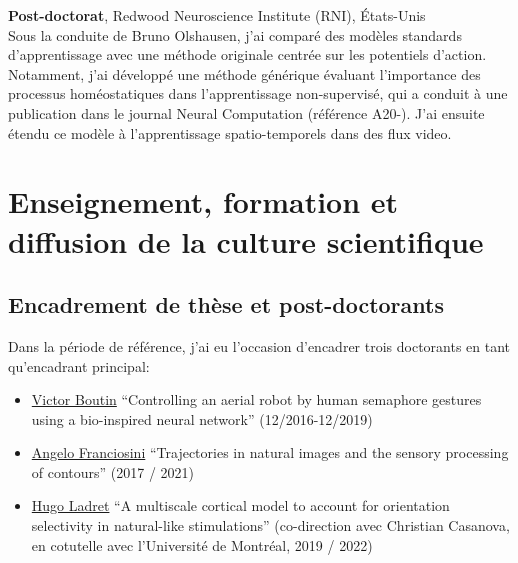 	\textbf{Post-doctorat}, Redwood Neuroscience Institute (RNI), \'Etats-Unis   \\	%
	 Sous la conduite de Bruno Olshausen, j'ai comparé des modèles standards d'apprentissage avec une méthode originale centrée sur les potentiels d'action. Notamment, j'ai développé une méthode générique évaluant l'importance des processus homéostatiques dans l'apprentissage non-supervisé, qui a conduit à une publication dans le journal Neural Computation (référence A20-\citep{Perrinet10shl}).   J'ai ensuite étendu ce modèle à  l'apprentissage spatio-temporels dans des flux video.
	 
\section{Enseignement, formation et diffusion de la culture scientifique} %

\subsection{Encadrement de thèse et post-doctorants} %

Dans la période de référence, j'ai eu l'occasion d'encadrer trois doctorants %
en tant qu'encadrant principal: %
\begin{itemize}
	\item \href{https://laurentperrinet.github.io/authors/victor-boutin/}{Victor Boutin} 	``Controlling an aerial robot by human semaphore gestures using a bio-inspired neural network'' (12/2016-12/2019)
	\item \href{https://laurentperrinet.github.io/authors/angelo-franciosini/}{Angelo Franciosini} ``Trajectories in natural images and the sensory processing of contours'' (2017 / 2021)
	\item \href{https://laurentperrinet.github.io/authors/hugo-ladret/}{Hugo Ladret} ``A multiscale cortical model to account for orientation selectivity in natural-like stimulations''  (co-direction avec Christian Casanova, en cotutelle avec l'Université de Montréal, 2019 / 2022)
\end{itemize}


